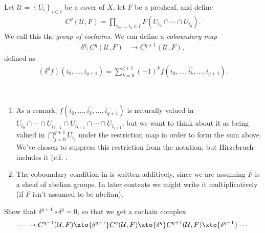 \documentclass[11pt]{amsart}
\begin{document}
Let $\mathcal{U} = \left\{ U_i \right\}_{i\in I}$ be a cover of $X$, let $F$ be a presheaf, and define
\begin{equation}\label{eqn:group-of-Cech-cochains}
\begin{aligned}
    C^q(\mathcal{U},F) = \prod_{i_0, \ldots, i_q \in I} F(U_{i_0} \cap \cdots \cap U_{i_q}).
\end{aligned}
\end{equation}
We call this the \emph{group of cochains}. We can define a \emph{coboundary map}
\begin{equation}\label{eqn:cech-coboundary-formula}
\begin{aligned}
    \delta^q \colon C^q(\mathcal{U},F) &\to C^{q+1}(\mathcal{U},F),
\end{aligned}
\end{equation}
defined as
\begin{align*}
    (\delta^q f)(i_0, \ldots, i_{q+1}) = \sum_{k=0}^{q+1} (-1)^k f(i_0, \ldots, \widehat{i_k}, \ldots, i_{q+1}).
\end{align*}
\begin{remark}\label{rmk:cech-cohomology-definition-notes} \, 
\begin{enumerate}
    \item As a remark, $f(i_0, \ldots, \widehat{i_k}, \ldots, i_{q+1})$ is naturally valued in $U_{i_0}\cap \cdots \cap U_{i_{k-1}} \cap U_{i_{k+1}}\cap \cdots \cap U_{i_{q+1}}$, but we want to think about it as being valued in $\bigcap_{j=0}^{q+1} U_{i_j}$ under the restriction map in order to form the sum above. We've chosen to suppress this restriction from the notation, but Hirzebruch includes it (c.f. \cite[p.~26]{Hirzebruch}.
    \item\label{abelian-coboundary-condition} The coboundary condition in  is written additively, since we are assuming $F$ is a sheaf of abelian groups. In later contexts we might write it multiplicatively (if $F$ isn't assumed to be abelian),
\end{enumerate}
\end{remark}

%
\begin{exercise} Show that $\delta^{q+1}\circ \delta^q = 0$, so that we get a cochain complex
\begin{equation}\label{eqn:Cech-cochain-complex}
\begin{aligned}
     \cdots \to C^{q-1}(\mathcal{U},F) \xto{\delta^{q-1}} C^q(\mathcal{U},F) \xto{\delta^q} C^{q+1}(\mathcal{U},F) \xto{\delta^{q+1}} \cdots
\end{aligned}
\end{equation}
\end{exercise}
\end{document}
